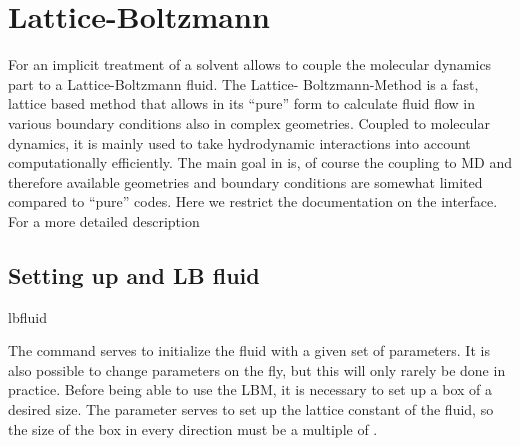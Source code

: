 %  
%   
%  
%  
%

\chapter{Lattice-Boltzmann}
\label{sec:lb}

For an implicit treatment of a solvent \es allows to couple the
molecular dynamics part to a Lattice-Boltzmann fluid. The Lattice-
Boltzmann-Method is a fast, lattice based method that allows in its
``pure'' form to calculate fluid flow in various boundary conditions
also in complex geometries. Coupled to molecular dynamics, it is
mainly used to take hydrodynamic interactions into account
computationally efficiently. The main goal in \es is, of course the
coupling to MD and therefore available geometries and boundary
conditions are somewhat limited compared to ``pure'' codes.  Here we
restrict the documentation on the interface. For a more detailed
description

\section{Setting up and LB fluid}
\begin{essyntax}
  lbfluid
  \begin{features}
  \end{features}
\end{essyntax}
The  command serves to initialize the fluid with a given
set of parameters. It is also possible to change parameters on the
fly, but this will only rarely be done in practice. Before being able
to use the LBM, it is necessary to set up a box of a desired size. The
parameter  serves to set up the lattice constant of the
fluid, so the size of the box in every direction must be a multiple of
.

